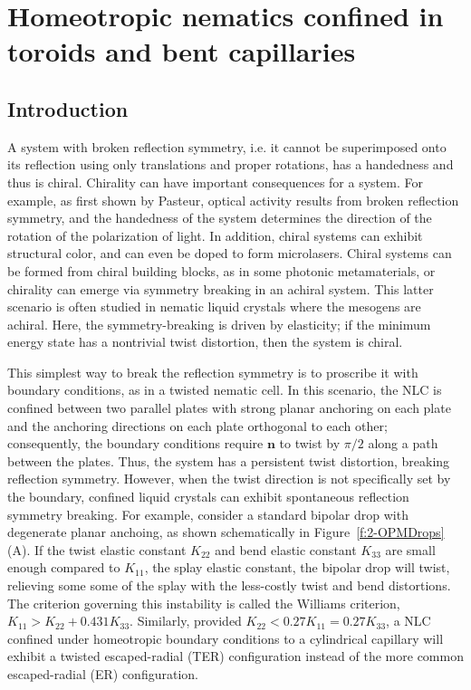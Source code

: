 \chapter{Homeotropic nematics confined in toroids and bent capillaries}

\section{Introduction}
A system with broken reflection symmetry, i.e. it cannot be superimposed onto its reflection using only translations and proper rotations, has a handedness and thus is chiral.
Chirality can have important consequences for a system.
For example, as first shown by Pasteur, optical activity results from broken reflection symmetry, and the handedness of the system determines the direction of the rotation of the polarization of light.
In addition, chiral systems can exhibit structural color, and can even be doped to form microlasers.
Chiral systems can be formed from chiral building blocks, as in some photonic metamaterials, or chirality can emerge via symmetry breaking in an achiral system.
This latter scenario is often studied in nematic liquid crystals where the mesogens are achiral.
Here, the symmetry-breaking is driven by elasticity; if the minimum energy state has a nontrivial twist distortion, then the system is chiral.

This simplest way to break the reflection symmetry is to proscribe it with boundary conditions, as in a twisted nematic cell.
In this scenario, the NLC is confined between two parallel plates with strong planar anchoring on each plate and the anchoring directions on each plate orthogonal to each other; consequently, the boundary conditions require $\mathbf{n}$ to twist by $\pi/2$ along a path between the plates.
Thus, the system has a persistent twist distortion, breaking reflection symmetry.
However, when the twist direction is not specifically set by the boundary, confined liquid crystals can exhibit spontaneous reflection symmetry breaking.
For example, consider a standard bipolar drop with degenerate planar anchoing, as shown schematically in Figure~\ref{f:2-OPMDrops}(A).
If the twist elastic constant $K_{22}$ and bend elastic constant $K_{33}$ are small enough compared to $K_{11}$, the splay elastic constant, the bipolar drop will twist, relieving some some of the splay with the less-costly twist and bend distortions.
The criterion governing this instability is called the Williams criterion, $K_{11} > K_{22}+ 0.431 K_{33}$.
Similarly, provided $K_{22}< 0.27 K_{11} = 0.27K_{33}$, a NLC confined under homeotropic boundary conditions to a cylindrical capillary will exhibit a twisted escaped-radial (TER) configuration instead of the more common escaped-radial (ER) configuration.

